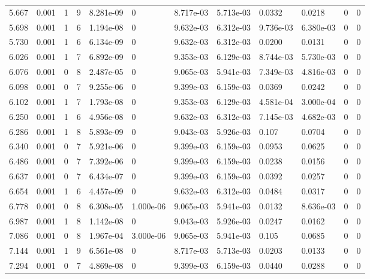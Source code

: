 \documentclass[preview]{standalone}
\begin{document}
{{{\begin{tabular}{L{1.2cm}C{1.2cm} C{0.3cm}C{0.5cm} C{1.4cm}C{1.4cm} C{1.4cm}C{1.4cm} C{1.6cm}C{1.6cm} C{1.6cm}C{1.6cm}}
  5.667  &  0.001  & 1     &  9 &  8.281e-09  & 0  &  8.717e-03&   5.713e-03& 0.0332 & 0.0218   &  0 & 0  \\ 
  5.698  &  0.001  & 1     &  6 &  1.194e-08  & 0  &  9.632e-03&   6.312e-03& 9.736e-03 & 6.380e-03   &  0 & 0  \\ 
  5.730  &  0.001  & 1     &  6 &  6.134e-09  & 0  &  9.632e-03&   6.312e-03& 0.0200 & 0.0131   &  0 & 0  \\ 
  6.026  &  0.001  & 1     &  7 &  6.892e-09  & 0  &  9.353e-03&   6.129e-03& 8.744e-03 & 5.730e-03   &  0 & 0  \\ 
  6.076  &  0.001  & 0     &  8 &  2.487e-05  & 0  &  9.065e-03&   5.941e-03& 7.349e-03 & 4.816e-03   &  0 & 0  \\ 
  6.098  &  0.001  & 0     &  7 &  9.255e-06  & 0  &  9.399e-03&   6.159e-03& 0.0369 & 0.0242   &  0 & 0  \\ 
  6.102  &  0.001  & 1     &  7 &  1.793e-08  & 0  &  9.353e-03&   6.129e-03& 4.581e-04 & 3.000e-04   &  0 & 0  \\ 
  6.250  &  0.001  & 1     &  6 &  4.956e-08  & 0  &  9.632e-03&   6.312e-03& 7.145e-03 & 4.682e-03   &  0 & 0  \\ 
  6.286  &  0.001  & 1     &  8 &  5.893e-09  & 0  &  9.043e-03&   5.926e-03& 0.107 & 0.0704   &  0 & 0  \\ 
  6.340  &  0.001  & 0     &  7 &  5.921e-06  & 0  &  9.399e-03&   6.159e-03& 0.0953 & 0.0625   &  0 & 0  \\ 
  6.486  &  0.001  & 0     &  7 &  7.392e-06  & 0  &  9.399e-03&   6.159e-03& 0.0238 & 0.0156   &  0 & 0  \\ 
  6.637  &  0.001  & 0     &  7 &  6.434e-07  & 0  &  9.399e-03&   6.159e-03& 0.0392 & 0.0257   &  0 & 0  \\ 
  6.654  &  0.001  & 1     &  6 &  4.457e-09  & 0  &  9.632e-03&   6.312e-03& 0.0484 & 0.0317   &  0 & 0  \\ 
  6.778  &  0.001  & 0     &  8 &  6.308e-05  & 1.000e-06  &  9.065e-03&   5.941e-03& 0.0132 & 8.636e-03   &  0 & 0  \\ 
  6.987  &  0.001  & 1     &  8 &  1.142e-08  & 0  &  9.043e-03&   5.926e-03& 0.0247 & 0.0162   &  0 & 0  \\ 
  7.086  &  0.001  & 0     &  8 &  1.967e-04  & 3.000e-06  &  9.065e-03&   5.941e-03& 0.105 & 0.0685   &  0 & 0  \\ 
  7.144  &  0.001  & 1     &  9 &  6.561e-08  & 0  &  8.717e-03&   5.713e-03& 0.0203 & 0.0133   &  0 & 0  \\ 
  7.294  &  0.001  & 0     &  7 &  4.869e-08  & 0  &  9.399e-03&   6.159e-03& 0.0440 & 0.0288   &  0 & 0  \\ 

\end{tabular}}}}
\end{document}
